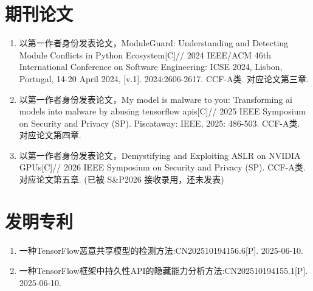 {
    \cleardoublepage

    \section*{期刊论文}
    \begin{enumerate}
        \item 以第一作者身份发表论文，ModuleGuard: Understanding and Detecting Module Conflicts in Python Ecosystem[C]// 2024 IEEE/ACM 46th International Conference on Software Engineering: ICSE 2024, Lisbon, Portugal, 14-20 April 2024, [v.1]. 2024:2606-2617. CCF-A类. 对应论文第三章.
        \item 以第一作者身份发表论文，My model is malware to you: Transforming ai models into malware by abusing tensorflow apis[C]// 2025 IEEE Symposium on Security and Privacy (SP). Piscataway: IEEE, 2025: 486-503. CCF-A类. 对应论文第四章.
        \item 以第一作者身份发表论文，Demystifying and Exploiting ASLR on NVIDIA GPUs[C]// 2026 IEEE Symposium on Security and Privacy (SP). CCF-A类. 对应论文第五章. (已被 S\&P2026 接收录用，还未发表)
    \end{enumerate}

    \section*{发明专利}
    \begin{enumerate}
        \item 一种TensorFlow恶意共享模型的检测方法:CN202510194156.6[P]. 2025-06-10.
        \item 一种TensorFlow框架中持久性API的隐藏能力分析方法:CN202510194155.1[P]. 2025-06-10.
    \end{enumerate}

}
